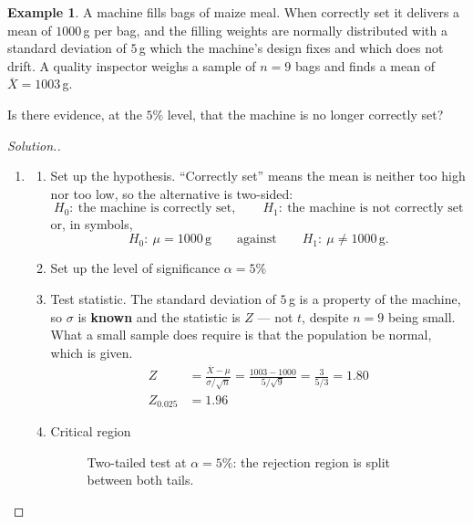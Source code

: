 \documentclass[11pt,a4paper]{article}
\theoremstyle{definition}
\newtheorem{example}[thm]{Example}
\newenvironment{solution}
  {\renewcommand{\qedsymbol}{}\begin{proof}[\textit{Solution}.]}
  {\end{proof}}
\begin{document}
\begin{example}
A machine fills bags of maize meal. When correctly set it delivers a mean of $1000$\,g per
bag, and the filling weights are normally distributed with a standard deviation of $5$\,g
which the machine's design fixes and which does not drift. A quality inspector weighs a
sample of $n=9$ bags and finds a mean of $\overline{X}=1003$\,g.

Is there evidence, at the $5\%$ level, that the machine is no longer correctly set?
\end{example}

\begin{solution}
\begin{enumerate}
\item
\begin{enumerate}
   \item Set up the hypothesis. ``Correctly set'' means the mean is neither too high nor too
low, so the alternative is two-sided:
\[H_0:\ \text{the machine is correctly set},\qquad H_1:\ \text{the machine is not correctly set}\]
or, in symbols,
\[H_0:\ \mu=1000\,\text{g}\qquad\text{against}\qquad H_1:\ \mu\neq 1000\,\text{g}.\]

\item Set up the level of significance $\alpha =5\%$
\item Test statistic. The standard deviation of $5$\,g is a property of the machine, so
$\sigma$ is \textbf{known} and the statistic is $Z$ --- not $t$, despite $n=9$ being small.
What a small sample does require is that the population be normal, which is given.
\begin{align*}
Z &=\frac{\overline{X}-\mu}{\sigma/\sqrt{n}}=\frac{1003-1000}{5/\sqrt{9}}=\frac{3}{5/3}=1.80\\
Z_{0.025}&=1.96
\end{align*}
\item Critical region




\begin{figure}[H]
\centering
{}
\caption{Two-tailed test at $\alpha=5\%$: the rejection region is split between both tails.}
\end{figure}










\end{enumerate}
\end{enumerate}
\end{solution}
\end{document}
